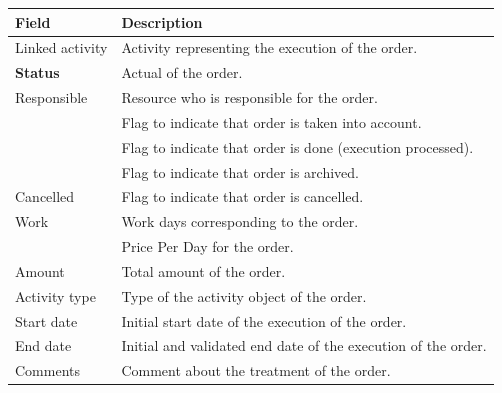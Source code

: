 \documentclass[letterpaper,10pt,english]{sphinxmanual}
\begin{document}
\begin{tabulary}{\linewidth}{|l|l|}
\hline
\textsf{\relax 
Field
} & \textsf{\relax 
Description
}\\
\hline
Linked activity
 & 
Activity representing the execution of the order.
\\
\hline
\textbf{Status}
 & 
Actual {\hyperref[Glossary:term-status]{\emph{}}} of the order.
\\
\hline
Responsible
 & 
Resource who is responsible for the order.
\\
\hline
{\hyperref[Glossary:term-handled]{\emph{}}}
 & 
Flag to indicate that order is taken into account.
\\
\hline
{\hyperref[Glossary:term-done]{\emph{}}}
 & 
Flag to indicate that order is done (execution processed).
\\
\hline
{\hyperref[Glossary:term-closed]{\emph{}}}
 & 
Flag to indicate that order is archived.
\\
\hline
Cancelled
 & 
Flag to indicate that order is cancelled.
\\
\hline
Work
 & 
Work days corresponding to the order.
\\
\hline
{\hyperref[Glossary:term-ppd]{\emph{}}}
 & 
Price Per Day for the order.
\\
\hline
Amount
 & 
Total amount of the order.
\\
\hline
Activity type
 & 
Type of the activity object of the order.
\\
\hline
Start date
 & 
Initial start date of the execution of the order.
\\
\hline
End date
 & 
Initial and validated end date of the execution of the order.
\\
\hline
Comments
 & 
Comment about the treatment of the order.
\\
\hline\end{tabulary}
\end{document}
